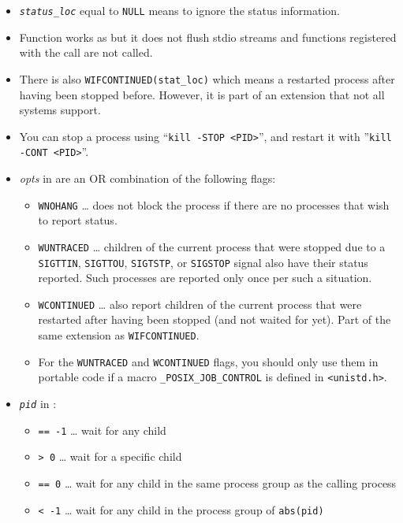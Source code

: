 \begin{itemize}
\item \emph{\texttt{status\_loc}} equal to \texttt{NULL} means to ignore the
status information.
\item Function  works as  but it does not flush stdio
streams and functions registered with the  call are not called.
\item There is also \texttt{WIFCONTINUED(stat\_loc)} which means a restarted
process after having been stopped before.  However, it is part of an extension
that not all systems support.
\item You can stop a process using ``\texttt{kill -STOP <PID>}'',
and restart it with ''\texttt{kill -CONT <PID>}''.
\item \emph{opts} in  are an OR combination of the following
flags:
    \begin{itemize}
    \item \texttt{WNOHANG} \dots{} does not block the process if there are
    no processes that wish to report status.
    \item \texttt{WUNTRACED} \dots{} children of the current process that were
    stopped due to a \texttt{SIGTTIN}, \texttt{SIGTTOU}, \texttt{SIGTSTP}, or
    \texttt{SIGSTOP} signal also have their status reported.  Such processes are
    reported only once per such a situation.
    \item \texttt{WCONTINUED} \dots{} also report children of the current
    process that were restarted after having been stopped (and not waited for
    yet).  Part of the same extension as \texttt{WIFCONTINUED}.
    \item For the \texttt{WUNTRACED} and \texttt{WCONTINUED} flags, you should
    only use them in portable code if a macro \texttt{\_POSIX\_JOB\_CONT\-ROL}
    is defined in \texttt{<unistd.h>}.
    \end{itemize}
\item \emph{\texttt{pid}} in :
    \begin{itemize}
    \item \texttt{== -1} \dots{} wait for any child
    \item \texttt{> 0} \dots{} wait for a specific child
    \item \texttt{== 0} \dots{} wait for any child in the same process group as
    the calling process
    \item \texttt{< -1} \dots{} wait for any child in the process group of
    \texttt{abs(pid)}

\end{itemize}
\end{itemize}
